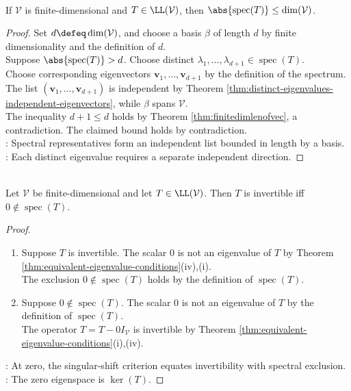 \begin{corollary} \label{cor:number-of-distinct-eigenvalues} \\
If $\mathcal{V}$ is finite-dimensional and $T\in\LL(\mathcal{V})$, then $\abs{\operatorname{spec}(T)}\leq\dim(\mathcal{V})$.
\begin{proof}
Set $d\defeq\dim(\mathcal{V})$, and choose a basis $\beta$ of length $d$ by finite dimensionality and the definition of $d$.\\
Suppose $\abs{\operatorname{spec}(T)}>d$. Choose distinct $\lambda_1,\ldots,\lambda_{d+1}\in\operatorname{spec}(T)$.\\
Choose corresponding eigenvectors $\mathbf{v}_1,\ldots,\mathbf{v}_{d+1}$ by the definition of the spectrum.\\
The list $(\mathbf{v}_1,\ldots,\mathbf{v}_{d+1})$ is independent by Theorem \ref{thm:distinct-eigenvalues-independent-eigenvectors}, while $\beta$ spans $\mathcal{V}$.\\
The inequality $d+1\leq d$ holds by Theorem \ref{thm:finitedimlenofvec}, a contradiction. The claimed bound holds by contradiction.\\
: Spectral representatives form an independent list bounded in length by a basis.\\
: Each distinct eigenvalue requires a separate independent direction.
\end{proof}
\end{corollary}

\begin{corollary} \label{cor:invertible-iff-zero-not-eigenvalue} \\
Let $\mathcal{V}$ be finite-dimensional and let $T\in\LL(\mathcal{V})$. Then $T$ is invertible iff $0\notin\operatorname{spec}(T)$.
\begin{proof}
\begin{enumerate}[label=\roman*.]
\setlength{\itemsep}{0pt}
\item[$(\Rightarrow)$] Suppose $T$ is invertible. The scalar $0$ is not an eigenvalue of $T$ by Theorem \ref{thm:equivalent-eigenvalue-conditions}(iv),(i).\\
The exclusion $0\notin\operatorname{spec}(T)$ holds by the definition of $\operatorname{spec}(T)$.
\item[$(\Leftarrow)$] Suppose $0\notin\operatorname{spec}(T)$. The scalar $0$ is not an eigenvalue of $T$ by the definition of $\operatorname{spec}(T)$.\\
The operator $T=T-0I_{\mathcal{V}}$ is invertible by Theorem \ref{thm:equivalent-eigenvalue-conditions}(i),(iv).
\end{enumerate}
: At zero, the singular-shift criterion equates invertibility with spectral exclusion.\\
: The zero eigenspace is $\ker(T)$.
\end{proof}
\end{corollary}

